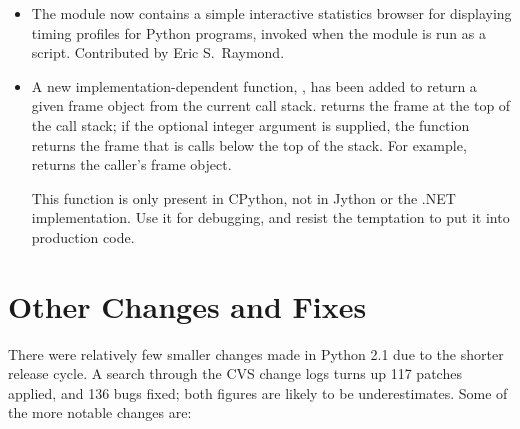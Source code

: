 \documentclass{howto}
\begin{document}
\begin{itemize}
\item The  module now contains a simple interactive
statistics browser for displaying timing profiles for Python programs,
invoked when the module is run as a script.  Contributed by 
Eric S.\ Raymond.

\item A new implementation-dependent function, ,
has been added to return a given frame object from the current call stack.
 returns the frame at the top of the call stack; 
if the optional integer argument  is supplied, the function returns the frame
that is  calls below the top of the stack.  For example, 
returns the caller's frame object.

This function is only present in CPython, not in Jython or the .NET
implementation.  Use it for debugging, and resist the temptation to
put it into production code.



\end{itemize}

\section{Other Changes and Fixes}

There were relatively few smaller changes made in Python 2.1 due to
the shorter release cycle.  A search through the CVS change logs turns
up 117 patches applied, and 136 bugs fixed; both figures are likely to
be underestimates.  Some of the more notable changes are:
\end{document}
